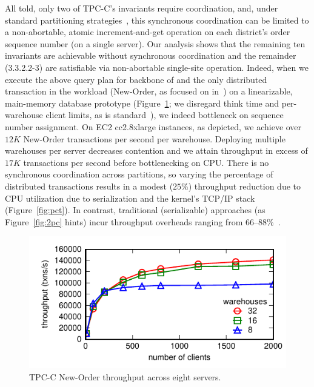 All told, only two of TPC-C's invariants require coordination, and,
under standard partitioning strategies~\cite{calvin,schism}, this
synchronous coordination can be limited to a non-abortable, atomic
increment-and-get operation on each district's order sequence number
(on a single server). Our \cfreedom analysis shows that the remaining
ten invariants are achievable without synchronous coordination and the
remainder (3.3.2.2-3) are satisfiable via non-abortable single-site
operation. Indeed, when we execute the above query plan for backbone
of and the only distributed transaction in the workload (New-Order, as
focused on in~\cite{calvin}) on a linearizable, main-memory database
prototype (Figure~\ref{fig:clients}; we disregard think time and
per-warehouse client limits, as is
standard~\cite{calvin,hstore,abadi-vll,jones-dtxn}), we indeed
bottleneck on sequence number assignment. On EC2 cc2.8xlarge
instances, as depicted, we achieve over $12K$ New-Order transactions
per second per warehouse. Deploying multiple warehouses per server
decreases contention and we attain throughput in excess of $17K$
transactions per second before bottlenecking on CPU. There is no
synchronous coordination across partitions, so varying the percentage
of distributed transactions results in a modest ($25\%$) throughput
reduction due to CPU utilization due to serialization and the kernel's
TCP/IP stack (Figure~\ref{fig:pct}). In contrast, traditional
(serializable) approaches (as Figure~\ref{fig:2pc} hints) incur
throughput overheads ranging from 66--88\%~\cite{abadi-vll}.

\begin{figure}
\includegraphics[width=\columnwidth]{figs/wh_thru.pdf}\vspace{-1em}
\caption{TPC-C New-Order throughput across eight servers.}
\label{fig:clients}
\end{figure}

